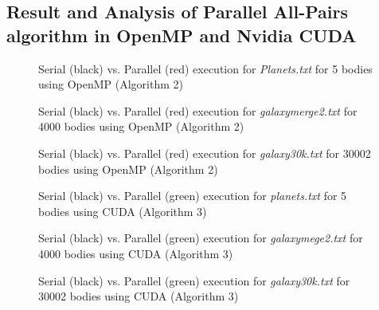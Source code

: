 \subsection{Result and Analysis of Parallel All-Pairs algorithm in  OpenMP and Nvidia CUDA}

\begin{figure}[thpb]
      \centering
      \caption{Serial (black) vs. Parallel (red) execution for \textit{Planets.txt} \cite{c4} for 5 bodies using OpenMP (Algorithm 2)
}
      \label{fig:3}
\end{figure}

\begin{figure}[thpb]
      \centering
      \caption{Serial (black) vs. Parallel (red) execution for \textit{galaxymerge2.txt} \cite{c4} for 4000 bodies using OpenMP (Algorithm 2)
}
      \label{fig:4}
\end{figure}

\begin{figure}[thpb]
      \centering
      \caption{Serial (black) vs. Parallel (red) execution for \textit{galaxy30k.txt} \cite{c4} for 30002 bodies using OpenMP (Algorithm 2)
}
      \label{fig:5}
\end{figure}

\begin{figure}[thpb]
      \centering
      \caption{Serial (black) vs. Parallel (green) execution for \textit{planets.txt} \cite{c4} for 5 bodies using CUDA (Algorithm 3)
}
      \label{fig:6}
\end{figure}

\begin{figure}[thpb]
      \centering
      \caption{Serial (black) vs. Parallel (green) execution for \textit{galaxymege2.txt} \cite{c4} for 4000 bodies using CUDA (Algorithm 3)
}
      \label{fig:7}
\end{figure}

\begin{figure}[thpb]
      \centering
      \caption{Serial (black) vs. Parallel (green) execution for \textit{galaxy30k.txt} \cite{c4} for 30002 bodies using CUDA (Algorithm 3)
}
      \label{fig:8}
\end{figure}

